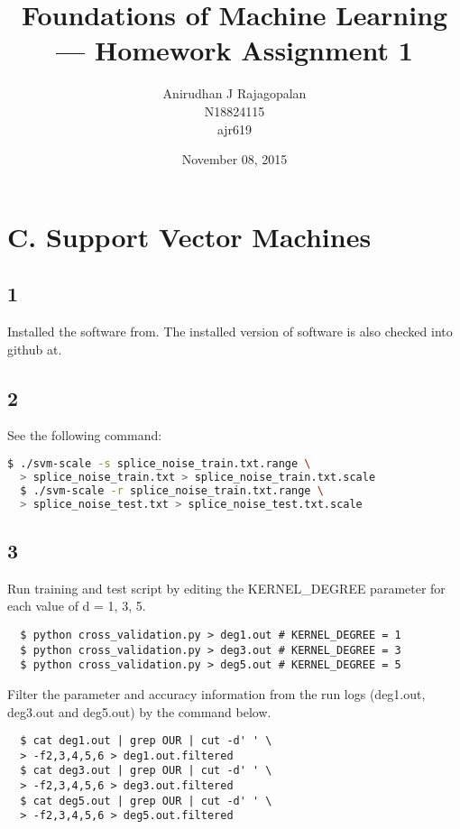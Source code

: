 \documentclass{article}
\begin{document}
\title{Foundations of Machine Learning --- Homework Assignment 1}
\date{November 08, 2015}
\author{Anirudhan J Rajagopalan\\ N18824115\\ ajr619}

\maketitle

\newpage

\section*{C. Support Vector Machines}
\subsection*{1}
Installed the software from\cite{libsvm}.  The installed version of software is also checked into github at\cite{githuburl}. 
\subsection*{2}

\noindent See the following command:
\begin{lstlisting}[language=bash]
  $ ./svm-scale -s splice_noise_train.txt.range \  
  > splice_noise_train.txt > splice_noise_train.txt.scale
  $ ./svm-scale -r splice_noise_train.txt.range \
  > splice_noise_test.txt > splice_noise_test.txt.scale
\end{lstlisting}

\subsection*{3}
Run training and test script\cite{cvscript} by editing the KERNEL\_DEGREE parameter for each value of d = 1, 3, 5.
\begin{lstlisting}
  $ python cross_validation.py > deg1.out # KERNEL_DEGREE = 1
  $ python cross_validation.py > deg3.out # KERNEL_DEGREE = 3
  $ python cross_validation.py > deg5.out # KERNEL_DEGREE = 5
\end{lstlisting}

Filter the parameter and accuracy information from the run logs (deg1.out, deg3.out and deg5.out) by the command below.
\begin{lstlisting}
  $ cat deg1.out | grep OUR | cut -d' ' \
  > -f2,3,4,5,6 > deg1.out.filtered
  $ cat deg3.out | grep OUR | cut -d' ' \
  > -f2,3,4,5,6 > deg3.out.filtered
  $ cat deg5.out | grep OUR | cut -d' ' \
  > -f2,3,4,5,6 > deg5.out.filtered
\end{lstlisting}
\end{document}
